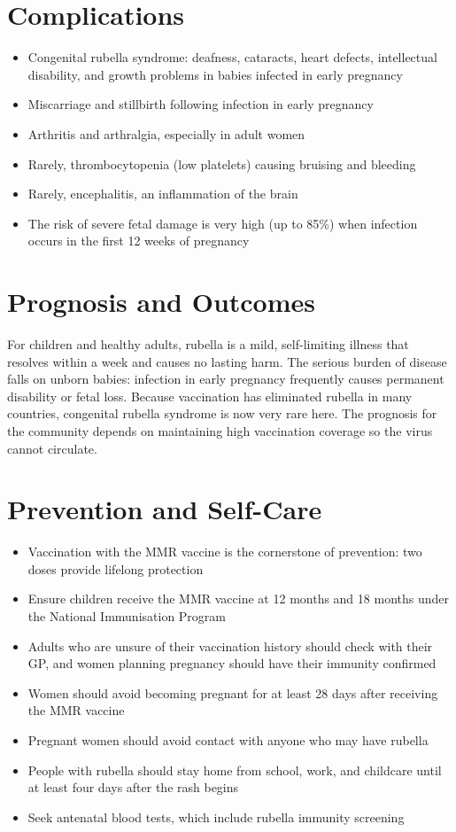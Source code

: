 \section*{Complications}
\begin{itemize}
    \item Congenital rubella syndrome: deafness, cataracts, heart defects, intellectual disability, and growth problems in babies infected in early pregnancy
    \item Miscarriage and stillbirth following infection in early pregnancy
    \item Arthritis and arthralgia, especially in adult women
    \item Rarely, thrombocytopenia (low platelets) causing bruising and bleeding
    \item Rarely, encephalitis, an inflammation of the brain
    \item The risk of severe fetal damage is very high (up to 85\%) when infection occurs in the first 12 weeks of pregnancy
\end{itemize}

\section*{Prognosis and Outcomes}
For children and healthy adults, rubella is a mild, self-limiting illness that resolves within a week and causes no lasting harm. The serious burden of disease falls on unborn babies: infection in early pregnancy frequently causes permanent disability or fetal loss. Because vaccination has eliminated rubella in many countries, congenital rubella syndrome is now very rare here. The prognosis for the community depends on maintaining high vaccination coverage so the virus cannot circulate.

\section*{Prevention and Self-Care}
\begin{itemize}
    \item Vaccination with the MMR vaccine is the cornerstone of prevention: two doses provide lifelong protection
    \item Ensure children receive the MMR vaccine at 12 months and 18 months under the National Immunisation Program
    \item Adults who are unsure of their vaccination history should check with their GP, and women planning pregnancy should have their immunity confirmed
    \item Women should avoid becoming pregnant for at least 28 days after receiving the MMR vaccine
    \item Pregnant women should avoid contact with anyone who may have rubella
    \item People with rubella should stay home from school, work, and childcare until at least four days after the rash begins
    \item Seek antenatal blood tests, which include rubella immunity screening
\end{itemize}

